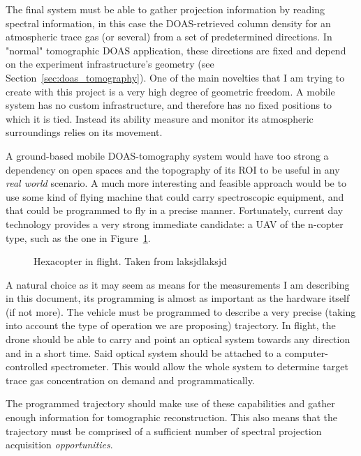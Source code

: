 The final system must be able to gather projection information by
reading spectral information, in this case the \gls{DOAS}-retrieved
column density for an atmospheric trace gas (or several) from a set of
predetermined directions. In "normal" tomographic \gls{DOAS}
application, these directions are fixed and depend on the experiment
infrastructure's geometry (see Section~\ref{sec:doas_tomography}). One
of the main novelties that I am trying to create with this project is a
very high degree of geometric freedom. A mobile system has no custom
infrastructure, and therefore has no fixed positions to which it is
tied. Instead its ability measure and monitor its atmospheric
surroundings relies on its movement. 

A ground-based mobile \gls{DOAS}-tomography system would have too strong
a dependency on open spaces and the topography of its \gls{ROI} to be
useful in any \textit{real world} scenario. A much more interesting and
feasible approach would be to use some kind of flying machine that could
carry spectroscopic equipment, and that could be programmed to fly in a
precise manner. Fortunately, current day technology provides a very
strong immediate candidate: a \gls{UAV} of the n-copter type, such as
the one in Figure~\ref{fig:an_hexacopter}.

\begin{figure}[htpb]
    \centering
    \caption{Hexacopter in flight. Taken from laksjdlaksjd}
    \label{fig:an_hexacopter}
\end{figure}

A natural choice as it may seem as means for the measurements I am
describing in this document, its programming is almost  as important as
the hardware itself (if not more). The vehicle must be programmed to
describe a very precise (taking into account the type of operation we
are proposing) trajectory. In flight, the drone should be able to carry
and point an optical system towards any direction and in a short time.
Said optical system should be attached to a computer-controlled
spectrometer. This would allow the whole system to determine target
trace gas concentration on demand and programmatically.

The programmed trajectory should make use of these capabilities and
gather enough information for tomographic reconstruction. This also
means that the trajectory must be comprised of a sufficient number of
spectral projection acquisition \emph{opportunities}.

